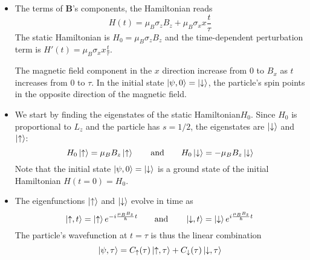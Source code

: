 \documentclass[11pt, a4paper]{article}
\newcommand{\eqtext}[1]{\qquad \text{#1} \qquad}
\newcommand{\Ham}{Hamiltonian\xspace}
\renewcommand{\vec}[1]{\bm{#1}} %
\newcommand{\p}{\psi}  %
\newcommand{\ua}{\uparrow}  %
\newcommand{\da}{\downarrow}  %
\begin{document}
\begin{itemize}

	\item The terms of $ \vec{B} $'s components, the \Ham reads
	\begin{equation*}
		H(t) = \mu_{B}\sigma_{z}B_{z} + \mu_{B}\sigma_{x}x\frac{t}{\tau}
	\end{equation*}
	The static \Ham is $ H_{0} = \mu_{B}\sigma_{z}B_{z} $ and the time-dependent perturbation term is $ H'(t) = \mu_{B}\sigma_{x}x\frac{t}{\tau} $.
	
	The magnetic field component in the $ x $ direction increase from $ 0 $ to $ B_{x} $ as $ t $ increases from $ 0  $ to $ \tau $. In the initial state $ \ket{\p, 0} = \ket{\da} $, the particle's spin points in the opposite direction of the magnetic field. 


	\item We start by finding the eigenstates of the static \Ham $ H_{0} $. Since $ H_{0} $ is proportional to $ L_{z} $ and the particle has $ s = 1/2 $, the eigenstates are $ \ket{\da} $ and $ \ket{\ua} $:
	\begin{equation*}
		H_{0}\ket{\ua} = \mu_{B}B_{z} \ket{\ua} \eqtext{and} H_{0}\ket{\da} = -\mu_{B}B_{z} \ket{\da} 
	\end{equation*}
	Note that the initial state $ \ket{\p, 0} = \ket{\da} $ is a ground state of the initial Hamiltonian $ H(t = 0) = H_{0} $. 
	
	\item The eigenfunctions $ \ket{\ua} $ and $ \ket{\da} $ evolve in time as
	\begin{equation*}
		\ket{\ua, t} = \ket{\ua} e^{-i\frac{\mu_{B}B_{z}}{\hbar}t} \eqtext{and} \ket{\da, t} = \ket{\da} e^{i\frac{\mu_{B}B_{z}}{\hbar}t}
	\end{equation*}
	The particle's wavefunction at $ t = \tau $ is thus the linear combination
	\begin{equation*}
		\ket{\p, \tau} = C_{\ua}(\tau) \ket{\ua, \tau} +  C_{\da}(\tau) \ket{\da, \tau} 
	\end{equation*}
	

\end{itemize}
\end{document}
